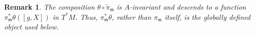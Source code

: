 \documentclass[11pt]{amsart}
\theoremstyle{definition}
\theoremstyle{plain}
\newtheorem{remark}[theorem]{Remark}
\theoremstyle{conclusion}
\begin{document}
\begin{remark}
\label{re:property}
  The composition $\theta \circ \widetilde{\pi}_\mathfrak{m}$ is $A$-invariant and descends to a function $\pi_\mathfrak{m}^*\theta([g,X])$ in $T^*M$. Thus, $\pi_\mathfrak{m}^*\theta$, rather than $\pi_\mathfrak{m}$ itself, is the globally defined object used below. %

\end{remark}
\end{document}
